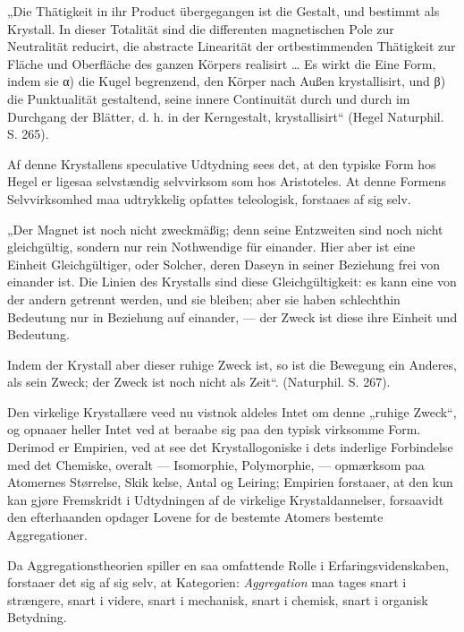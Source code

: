 \documentclass[12pt]{book}
\newcommand{\opage}[1]{\marginnote{\footnotesize\textit{[#1]}}}
\begin{document}
„Die Thätigkeit in ihr Product übergegangen ist die Gestalt, und bestimmt als Krystall. In dieser
Totalität sind die differenten magnetischen Pole zur Neutralität reducirt, die abstracte Linearität
der ortbestimmenden Thätigkeit zur Fläche und Oberfläche des ganzen Körpers realisirt \ldots{} Es
wirkt die Eine Form, indem sie α) die Kugel begrenzend, den Körper nach Außen krystallisirt, und β)
die Punktualität gestaltend, seine innere Continuität durch und durch im Durchgang der Blätter,
d. h. in der Kerngestalt, krystallisirt“ (Hegel Naturphil. S. 265).

Af denne Krystallens speculative Udtydning sees det, at den typiske Form hos Hegel er ligesaa
selvstændig selvvirksom som hos Aristoteles. At denne Formens Selvvirksomhed maa udtrykkelig
opfattes teleologisk, forstaaes af sig selv.

„Der Magnet ist noch nicht zweckmäßig; denn seine Entzweiten sind noch nicht gleichgültig, sondern
nur rein Nothwendige für einander. Hier aber ist eine Einheit Gleichgültiger, oder Solcher, deren
Daseyn in seiner Beziehung frei von einander ist. Die Linien des Krystalls sind diese
Gleichgültigkeit: es kann eine von der andern getrennt werden, und sie bleiben; aber sie haben
schlechthin Bedeutung nur in Beziehung auf einander, --- der Zweck ist diese ihre Einheit und
Bedeutung.

Indem der Krystall aber dieser ruhige Zweck ist, so ist die Bewegung ein Anderes, als sein Zweck;
der Zweck ist noch nicht als Zeit“. (Naturphil. S. 267).

Den virkelige Krystallære veed nu vistnok aldeles Intet om denne „ruhige Zweck“, og opnaaer heller
Intet ved at beraabe sig paa den typisk virksomme Form. Derimod er Empirien, ved at see det
Krystallogoniske i dets inderlige Forbindelse med det Chemiske, overalt --- Isomorphie, Polymorphie,
--- opmærksom paa Atomernes Størrelse, Skik%
\opage{176}kelse, Antal og Leiring; Empirien forstaaer, at den kun kan gjøre Fremskridt i Udtydningen af de
virkelige Krystaldannelser, forsaavidt den efterhaanden opdager Lovene for de bestemte Atomers
bestemte Aggregationer.

Da Aggregationstheorien spiller en saa omfattende Rolle i Erfaringsvidenskaben, forstaaer det sig af
sig selv, at Kategorien: \emph{Aggregation} maa tages snart i strængere, snart i videre, snart i
mechanisk, snart i chemisk, snart i organisk Betydning.
\end{document}
